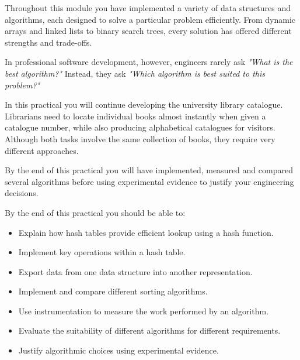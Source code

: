 \documentclass{csc2059practical}
\begin{document}
\maketitle

\tableofcontents
\clearpage

Throughout this module you have implemented a variety of data structures and algorithms, each designed to solve a particular problem efficiently. From dynamic arrays and linked lists to binary search trees, every solution has offered different strengths and trade-offs.

In professional software development, however, engineers rarely ask \emph{"What is the best algorithm?"} Instead, they ask \emph{"Which algorithm is best suited to this problem?"}

In this practical you will continue developing the university library catalogue. Librarians need to locate individual books almost instantly when given a catalogue number, while also producing alphabetical catalogues for visitors. Although both tasks involve the same collection of books, they require very different approaches.

By the end of this practical you will have implemented, measured and compared several algorithms before using experimental evidence to justify your engineering decisions.

\begin{learningoutcomes}
By the end of this practical you should be able to:

\begin{itemize}
    \item Explain how hash tables provide efficient lookup using a hash function.
    \item Implement key operations within a hash table.
    \item Export data from one data structure into another representation.
    \item Implement and compare different sorting algorithms.
    \item Use instrumentation to measure the work performed by an algorithm.
    \item Evaluate the suitability of different algorithms for different requirements.
    \item Justify algorithmic choices using experimental evidence.
\end{itemize}
\end{learningoutcomes}
\end{document}
